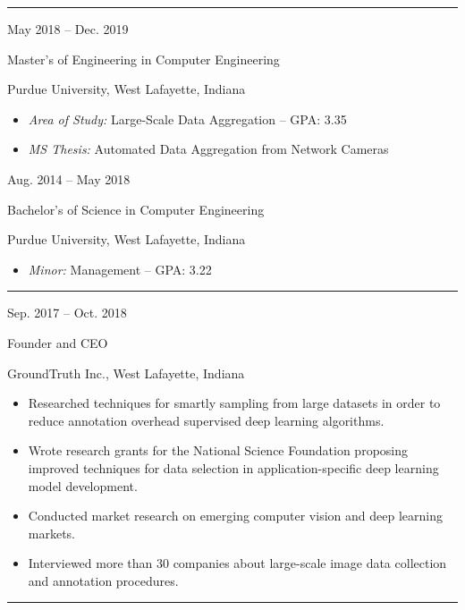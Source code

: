\documentclass[10pt]{article}
\newlength{\cvcolumngapwidth}
\newlength{\cvleftcolumnwidth}
\newlength{\cvrightcolumnwidth}
\newcommand{\cvsectionstyle}[1]{{\normalsize\cvsectionfont\textcolor{cvsectioncolor}{#1}}}
\newcommand{\cvtitlestyle}[1]{{\large\cvtitlefont\textcolor{cvtitlecolor}{#1}}}
\newcommand{\cvdurationstyle}[1]{{\small\cvdurationfont\textcolor{cvdurationcolor}{#1}}}
\newlength{\cvafteritemskipamount}
\newlength{\cvaftersectionskipamount}
\newlength{\cvparskip}
\newcommand{\cvsection}[1]{
    \begin{minipage}[t]{\cvleftcolumnwidth}
        \raggedleft\cvsectionstyle{#1}
    \end{minipage}%
    \hspace{\cvcolumngapwidth}%
    \begin{minipage}[t]{\cvrightcolumnwidth}
        \textcolor{cvrulecolor}{\rule{\cvrightcolumnwidth}{0.3mm}}
    \end{minipage}

    \vspace{\cvaftersectionskipamount}
}
\newcommand{\cvitem}[2]{
    \begin{minipage}[t]{\cvleftcolumnwidth}
        \raggedleft #1
    \end{minipage}%
    \hspace{\cvcolumngapwidth}%
    \begin{minipage}[t]{\cvrightcolumnwidth}
        \setlength{\parskip}{\cvparskip} #2
    \end{minipage}

    \vspace{\cvafteritemskipamount}
}
\newcommand{\cvtitle}[1]{
    \cvtitlestyle{#1}

    \vspace{1mm plus 0.25mm minus 0.25mm}
    \vspace{-\cvparskip}
}
\begin{document}
\cvsection{EDUCATION}

\cvitem{
    \cvdurationstyle{May 2018 -- Dec. 2019}
}{
    \cvtitle{Master's of Engineering in Computer Engineering}

    Purdue University, West Lafayette, Indiana

    \begin{itemize}[leftmargin=*]
        \item \textit{Area of Study:} Large-Scale Data Aggregation -- GPA: 3.35
        \item \textit{MS Thesis:} Automated Data Aggregation from Network Cameras
    \end{itemize}
}
\cvitem{
    \cvdurationstyle{Aug. 2014 -- May 2018}
}{
    \cvtitle{Bachelor's of Science in Computer Engineering}

    Purdue University, West Lafayette, Indiana

    \begin{itemize}[leftmargin=*]
        \item \textit{Minor:} Management -- GPA: 3.22
    \end{itemize}
}

\cvsection{ENTREPRENEURSHIP}

\cvitem{
    \cvdurationstyle{Sep. 2017 -- Oct. 2018}
}{
    \cvtitle{Founder and CEO}

    GroundTruth Inc., West Lafayette, Indiana

    \begin{itemize}[leftmargin=*]
        \item Researched techniques for smartly sampling from large datasets in order to reduce annotation overhead supervised deep learning algorithms.
        \item Wrote research grants for the National Science Foundation proposing improved techniques for data selection in application-specific deep learning model development.
        \item Conducted market research on emerging computer vision and deep learning markets.
        \item Interviewed more than 30 companies about large-scale image data collection and annotation procedures. 
    \end{itemize}
}

\cvsection{WORK EXPERIENCE}
\end{document}
